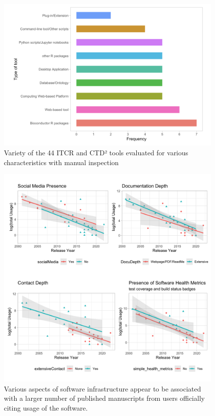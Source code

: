 \documentclass{article}
\begin{document}
\begin{figure} %
    \centering
\includegraphics[width=\textwidth,height=\textheight,keepaspectratio]{images/tool_diversity.png}
    \caption{Variety of the 44 ITCR and CTD² tools evaluated for various characteristics with manual inspection}
    \label{fig:tool_eval}
\end{figure}

\begin{figure} %
    \centering
\includegraphics[width=\textwidth,height=\textheight,keepaspectratio]{images/inf_cit.png}
    \caption{Various aspects of software infrastructure appear to be associated with a larger number of published manuscripts from users officially citing usage of the software.}
    \label{fig:inf_cit}
\end{figure}
\end{document}
